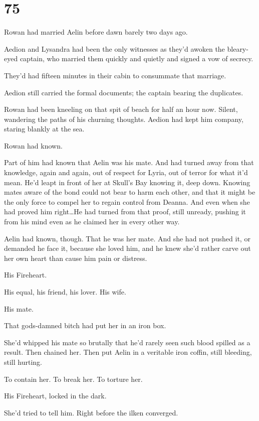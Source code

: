 
\chapter{75}

Rowan had married Aelin before dawn barely two days ago.

Aedion and Lysandra had been the only witnesses as they'd awoken the bleary-eyed captain, who married them quickly and quietly and signed a vow of secrecy.

They'd had fifteen minutes in their cabin to consummate that marriage.

Aedion still carried the formal documents; the captain bearing the duplicates.

Rowan had been kneeling on that spit of beach for half an hour now.
Silent, wandering the paths of his churning thoughts.
Aedion had kept him company, staring blankly at the sea.

Rowan had known.

Part of him had known that Aelin was his mate.
And had turned away from that knowledge, again and again, out of respect for Lyria, out of terror for what it'd mean.
He'd leapt in front of her at Skull's Bay knowing it, deep down.
Knowing mates aware of the bond could not bear to harm each other, and that it might be the only force to compel her to regain control from Deanna.
And even when she had proved him right\ldots He had turned from that proof, still unready, pushing it from his mind even as he claimed her in every other way.

Aelin had known, though.
That he was her mate.
And she had not pushed it, or demanded he face it, because she loved him, and he knew she'd rather carve out her own heart than cause him pain or distress.

His Fireheart.

His equal, his friend, his lover.
His wife.

His mate.

That gods-damned bitch had put her in an iron box.

She'd whipped his mate so brutally that he'd rarely seen such blood spilled as a result.
Then chained her.
Then put Aelin in a veritable iron coffin, still bleeding, still hurting.

To contain her.
To break her.
To torture her.

His Fireheart, locked in the dark.

She'd tried to tell him.
Right before the ilken converged.

